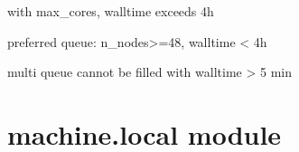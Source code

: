 \documentclass[letterpaper,10pt,english]{sphinxmanual}
\begin{document}
\begin{fulllineitems}
\label{\detokenize{machine:machine.cray.long_queue}}
with max\_cores, walltime exceeds 4h

\end{fulllineitems}


\begin{fulllineitems}
\label{\detokenize{machine:machine.cray.multi_queue}}
preferred queue: n\_nodes\textgreater{}=48, walltime \textless{} 4h

\end{fulllineitems}


\begin{fulllineitems}
\label{\detokenize{machine:machine.cray.small_queue}}
multi queue cannot be filled with walltime \textgreater{} 5 min

\end{fulllineitems}



\section{machine.local module}
\label{\detokenize{machine:module-machine.local}}\label{\detokenize{machine:machine-local-module}}
\end{document}
